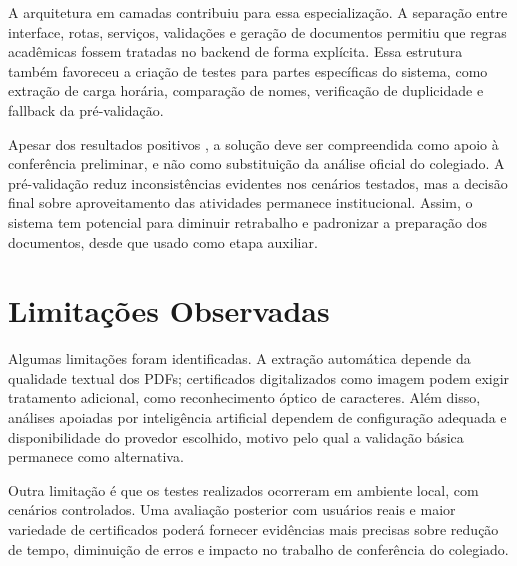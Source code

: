 A arquitetura em camadas contribuiu para essa especialização. A separação entre interface, rotas, serviços, validações e geração de documentos permitiu que regras acadêmicas fossem tratadas no backend de forma explícita. Essa estrutura também favoreceu a criação de testes para partes específicas do sistema, como extração de carga horária, comparação de nomes, verificação de duplicidade e fallback da pré-validação.


Apesar dos resultados positivos%
, a solução deve ser compreendida como apoio à conferência preliminar, e não como substituição da análise oficial do colegiado. A pré-validação reduz inconsistências evidentes nos cenários testados, mas a decisão final sobre aproveitamento das atividades permanece institucional. Assim, o sistema tem potencial para diminuir retrabalho e padronizar a preparação dos documentos, desde que usado como etapa auxiliar.

\section{Limitações Observadas}

Algumas limitações foram identificadas. A extração automática depende da qualidade textual dos PDFs; certificados digitalizados como imagem podem exigir tratamento adicional, como reconhecimento óptico de caracteres. Além disso, análises apoiadas por inteligência artificial dependem de configuração adequada e disponibilidade do provedor escolhido, motivo pelo qual a validação básica permanece como alternativa.


Outra limitação é que os testes realizados ocorreram em ambiente local, com cenários controlados. Uma avaliação posterior com usuários reais e maior variedade de certificados poderá fornecer evidências mais precisas sobre redução de tempo, diminuição de erros e impacto no trabalho de conferência do colegiado.
